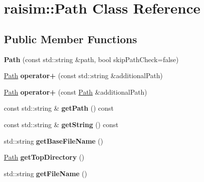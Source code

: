 \hypertarget{classraisim_1_1Path}{}\section{raisim\+:\+:Path Class Reference}
\label{classraisim_1_1Path}
\subsection*{Public Member Functions}
\begin{DoxyCompactItemize}
\item 
\mbox{\label{classraisim_1_1Path_adbba130bbb532a98db2dd7c9c32b1fe7}} 
{\bfseries Path} (const std\+::string \&path, bool skip\+Path\+Check=false)
\item 
\mbox{\label{classraisim_1_1Path_a040798be58814251ef510e120e6ea018}} 
\hyperlink{classraisim_1_1Path}{Path} {\bfseries operator+} (const std\+::string \&additional\+Path)
\item 
\mbox{\label{classraisim_1_1Path_a4a17cb56b011f7a12695bbb85ecf9c90}} 
\hyperlink{classraisim_1_1Path}{Path} {\bfseries operator+} (const \hyperlink{classraisim_1_1Path}{Path} \&additional\+Path)
\item 
\mbox{\label{classraisim_1_1Path_a7d5961547efbd753e5627c332c8e286f}} 
const std\+::string \& {\bfseries get\+Path} () const
\item 
\mbox{\label{classraisim_1_1Path_af14633d39d8eccbf8d03c68e43202624}} 
const std\+::string \& {\bfseries get\+String} () const
\item 
\mbox{\label{classraisim_1_1Path_ad8595245198a66c5aa997f9ec92413d2}} 
std\+::string {\bfseries get\+Base\+File\+Name} ()
\item 
\mbox{\label{classraisim_1_1Path_a50d72964411ab4a0fd0503fe709b9170}} 
\hyperlink{classraisim_1_1Path}{Path} {\bfseries get\+Top\+Directory} ()
\item 
\mbox{\label{classraisim_1_1Path_a8962d740afeb924135b78f929dab08f4}} 
std\+::string {\bfseries get\+File\+Name} ()

\end{DoxyCompactItemize}
